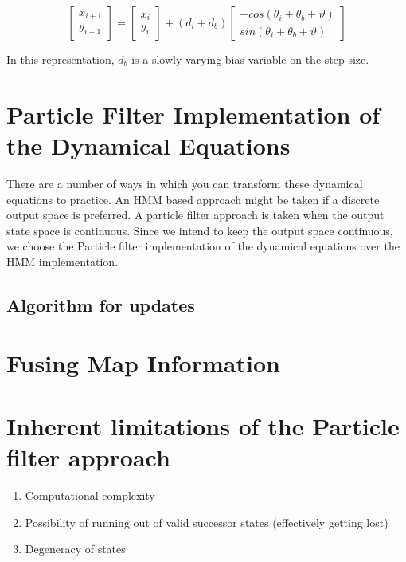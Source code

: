 \begin{equation}
\begin{bmatrix}x_{i+1}\\
y_{i+1}
\end{bmatrix} = \begin{bmatrix}x_{i}\\
y_{i}
\end{bmatrix}  + (d{}_{i}+d_{b}) \begin{bmatrix}-cos(\theta_{i}+\theta_{b}+\vartheta)\\
sin(\theta_{i}+\theta_{b}+\vartheta)
\end{bmatrix} 
\end{equation}

In this representation, $d_{b}$ is a slowly varying bias variable on the step size.

\section{Particle Filter Implementation of the Dynamical Equations}

There are a number of ways in which you can transform these dynamical 
equations to practice. An HMM based approach might be taken if a discrete
output space is preferred. A particle filter approach is taken when the 
output state space is continuous. Since we intend to keep the output space
continuous, we choose the Particle filter implementation of the dynamical
equations over the HMM implementation.

\subsection{Algorithm for updates}


\section{Fusing Map Information}


\section{Inherent limitations of the Particle filter approach}

\begin{enumerate}
\item Computational complexity
\item Possibility of running out of valid successor states (effectively getting lost)
\item Degeneracy of states
\end{enumerate}

